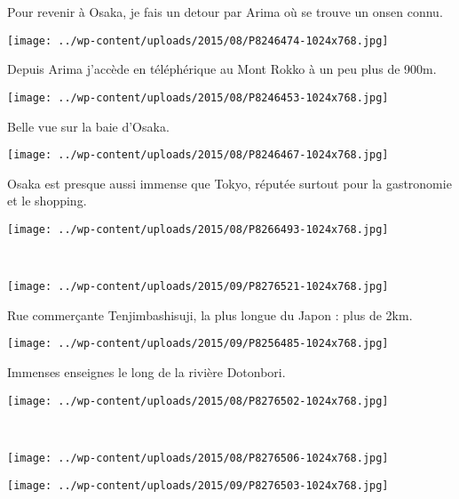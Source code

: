  Pour revenir à Osaka, je fais un detour par Arima où se trouve un onsen connu.
\begin{center} \texttt{[image: ../wp-content/uploads/2015/08/P8246474-1024x768.jpg]} \end{center}

 Depuis Arima j'accède en téléphérique au Mont Rokko à un peu plus de 900m.
\begin{center} \texttt{[image: ../wp-content/uploads/2015/08/P8246453-1024x768.jpg]} \end{center}
\vspace{-\topsep}
\pagebreak
 
 Belle vue sur la baie d'Osaka.\\
 \vspace{0.75mm}
\begin{center} \texttt{[image: ../wp-content/uploads/2015/08/P8246467-1024x768.jpg]} \end{center}

 Osaka est presque aussi immense que Tokyo, réputée surtout pour la gastronomie et le shopping. 
\begin{center} \texttt{[image: ../wp-content/uploads/2015/08/P8266493-1024x768.jpg]} \end{center}
\vspace{-\topsep}
\pagebreak
~
\begin{center} \texttt{[image: ../wp-content/uploads/2015/09/P8276521-1024x768.jpg]} \end{center}

 Rue commerçante Tenjimbashisuji, la plus longue du Japon : plus de 2km.
\begin{center} \texttt{[image: ../wp-content/uploads/2015/09/P8256485-1024x768.jpg]} \end{center}
\vspace{-\topsep}
\pagebreak
 
 Immenses enseignes le long de la rivière Dotonbori.
\begin{center} \texttt{[image: ../wp-content/uploads/2015/08/P8276502-1024x768.jpg]} \end{center}
~\\
\begin{center} \texttt{[image: ../wp-content/uploads/2015/08/P8276506-1024x768.jpg]} \end{center}
\begin{center} \texttt{[image: ../wp-content/uploads/2015/09/P8276503-1024x768.jpg]} \end{center}

